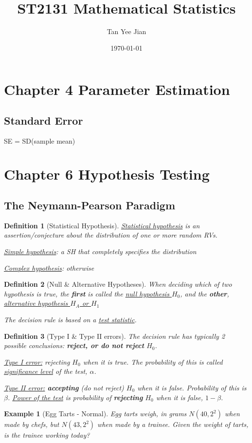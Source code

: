 \documentclass[11pt]{article}
\author{Tan Yee Jian}
\date{\today}
\title{ST2131 Mathematical Statistics}
\newtheorem{definition}{Definition}[section]
\newtheorem{ex}{Example}[section]
\begin{document}
\maketitle
\tableofcontents


\section{Chapter 4 Parameter Estimation}
\label{sec:org961607a}
\subsection{Standard Error}
\label{sec:org56fe284}
SE = SD(sample mean)
\section{Chapter 6 Hypothesis Testing}
\label{sec:orgced21f8}


\subsection{The Neymann-Pearson Paradigm}
\label{sec:org65f1871}
\begin{definition}[Statistical Hypothesis]

\uline{Statistical hypothesis} is an assertion/conjecture about the distribution of
one or more random RVs.

\uline{Simple hypothesis}: a SH that completely specifies the distribution

\uline{Complex hypothesis}: otherwise
\end{definition}

\begin{definition}[Null & Alternative Hypotheses]
When deciding which of two hypothesis is true, the \textbf{first} is called the \uline{null
hypothesis \(H_0\)}, and the \textbf{other}, \uline{alternative hypothesis \(H_A\) or \(H_1\)}

The decision rule is based on a \uline{test statistic}.
\end{definition}

\begin{definition}[Type I & Type II errors]
The decision rule has typically 2 possible conclusions: \textbf{reject, or do not
reject} \(H_0\).

\uline{Type I error:} rejecting \(H_0\) when it is true. The probability of this is
called \uline{significance level} of the test, \(\alpha\).

\uline{Type II error:} \textbf{accepting} (do not reject) \(H_0\) when it is false. Probability
of this is \(\beta\). \uline{Power of the test} is probability of \textbf{rejecting} \(H_0\)
when it is false, \(1-\beta\).
\end{definition}

\begin{ex}[Egg Tarts - Normal]
Egg tarts weigh, in grams \(N(40, 2^2)\) when made by chefs, but \(N(43, 2^2)\)
when made by a trainee. Given the weight of tarts, is the trainee working today?
\end{ex}
\end{document}

